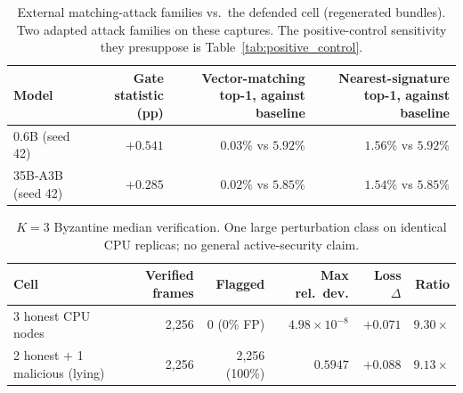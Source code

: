\documentclass[11pt]{article}
\begin{document}
\begin{table}[H]
\centering\scriptsize


\begin{tabular}{@{}lrrr@{}}
\toprule
Model & Gate statistic (pp) & Vector-matching top-1, against baseline & Nearest-signature top-1, against baseline \\
\midrule
0.6B (seed 42) & $+0.541$ & $0.03\%$ vs $5.92\%$ & $1.56\%$ vs $5.92\%$ \\
35B-A3B (seed 42) & $+0.285$ & $0.02\%$ vs $5.85\%$ & $1.54\%$ vs $5.85\%$ \\
\bottomrule
\end{tabular}
\caption{External matching-attack families vs.\ the defended cell (regenerated
bundles). Two adapted attack families on these captures. The positive-control
sensitivity they presuppose is Table~\ref{tab:positive_control}.}
\label{tab:matching}
\end{table}

\begin{table}[H]
\centering\scriptsize


\begin{tabular}{@{}lrrrrr@{}}
\toprule
Cell & Verified frames & Flagged & Max rel.\ dev. & Loss $\Delta$ & Ratio \\
\midrule
3 honest CPU nodes & 2{,}256 & 0 (0\% FP) & $4.98{\times}10^{-8}$ & $+0.071$ & $9.30\times$ \\
2 honest $+$ 1 malicious (lying) & 2{,}256 & 2{,}256 (100\%) & $0.5947$ & $+0.088$ & $9.13\times$ \\
\bottomrule
\end{tabular}
\caption{$K{=}3$ Byzantine median verification. One large perturbation
class on identical CPU replicas; no general active-security claim.}
\label{tab:byz}
\end{table}

\FloatBarrier


\end{document}
